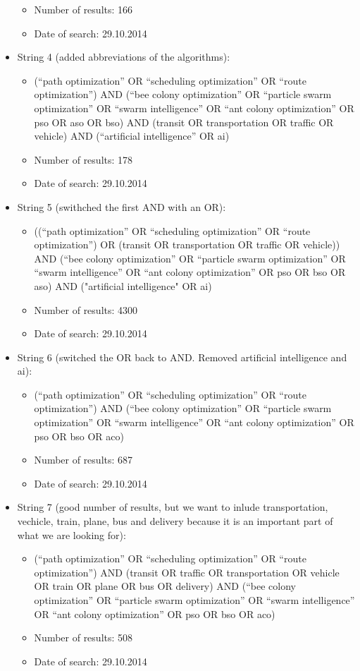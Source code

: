 \begin{itemize}
\begin{itemize}
\item Number of results: 166
\item Date of search: 29.10.2014
\end{itemize}
\item String 4 (added abbreviations of the algorithms):
\begin{itemize}
\item (``path optimization'' OR ``scheduling optimization'' OR ``route optimization'') AND (``bee colony optimization'' OR ``particle swarm optimization'' OR ``swarm intelligence'' OR ``ant colony optimization'' OR pso OR aso OR bso) AND (transit OR transportation OR traffic OR vehicle) AND (``artificial intelligence'' OR ai) 
\item Number of results: 178
\item Date of search: 29.10.2014
\end{itemize}
\item String 5 (swithched the first AND with an OR):
\begin{itemize}
\item((``path optimization'' OR ``scheduling optimization'' OR ``route optimization'') OR (transit OR transportation OR traffic OR vehicle)) AND (``bee colony optimization'' OR ``particle swarm optimization'' OR ``swarm intelligence'' OR ``ant colony optimization'' OR pso OR bso OR aso)  AND ("artificial intelligence" OR ai)
\item Number of results: 4300
\item Date of search: 29.10.2014
\end{itemize}
\item String 6 (switched the OR back to AND. Removed artificial intelligence and ai):
\begin{itemize}
\item(``path optimization'' OR ``scheduling optimization'' OR ``route optimization'') AND (``bee colony optimization'' OR ``particle swarm optimization'' OR ``swarm intelligence'' OR ``ant colony optimization'' OR pso OR bso OR aco) 
\item Number of results: 687
\item Date of search: 29.10.2014
\end{itemize}
\item String 7 (good number of results, but we want to inlude transportation, vechicle, train, plane, bus and delivery because it is an important part of what we are looking for):
\begin{itemize}
\item(``path optimization'' OR ``scheduling optimization'' OR ``route optimization'') AND (transit OR traffic OR transportation OR vehicle OR train OR plane OR bus OR delivery) AND (``bee colony optimization'' OR ``particle swarm optimization'' OR ``swarm intelligence'' OR ``ant colony optimization'' OR pso OR bso OR aco) 
\item Number of results: 508
\item Date of search: 29.10.2014
\end{itemize}
\end{itemize}

